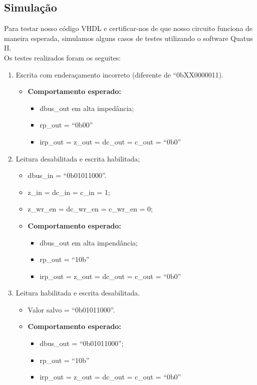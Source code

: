 \documentclass{article}
\begin{document}
\subsection{Simulação}

Para testar nosso código VHDL e certificar-nos de que nosso circuito funciona de maneira esperada, simulamos alguns casos de testes utilizando o software Quatus II.\\

Os testes realizados foram os seguites:

\begin{enumerate}
    \item Escrita com enderaçamento incorreto (diferente de ``0bXX0000011).
    \begin{itemize}
        \item \textbf{Comportamento esperado:}
        \begin{itemize}
            \item dbus\_out em alta impedância;
            \item rp\_out = ``0b00''
            \item irp\_out = z\_out = dc\_out = c\_out = ``0b0''
        \end{itemize}
    \end{itemize}
    
    \item Leitura desabilitada e escrita habilitada;
    \begin{itemize}
        \item dbus\_in = ``0b01011000''.\
        \item z\_in = dc\_in = c\_in = 1;
        \item z\_wr\_en = dc\_wr\_en = c\_wr\_en = 0;
        \item \textbf{Comportamento esperado:}
        \begin{itemize}
            \item dbus\_out em alta impendância;
            \item rp\_out = ``10b''
            \item irp\_out = z\_out = dc\_out = c\_out = ``0b0''
        \end{itemize}
    \end{itemize}

    \item Leitura habilitada e escrita desabilitada.
    \begin{itemize}
        \item Valor salvo = ``0b01011000''.
        \item \textbf{Comportamento esperado:}
        \begin{itemize}
            \item dbus\_out = ``0b01011000'';
            \item rp\_out = ``10b''
            \item irp\_out = z\_out = dc\_out = c\_out = ``0b0''
        \end{itemize}
    \end{itemize}


\end{enumerate}
\end{document}
